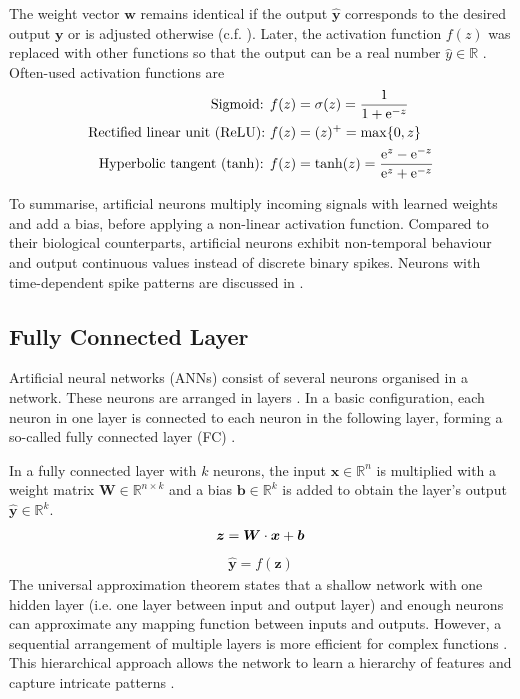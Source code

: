 %
The weight vector $\boldsymbol{w}$ remains identical if the output $\boldsymbol{\hat{y}}$ corresponds to the desired output $\boldsymbol{y}$ or is adjusted otherwise (c.f. ). Later, the activation function \(f(z)\) was replaced with other functions so that the output can be a real number \(\hat{y} \in \mathbb{R}\) . Often-used activation functions are
%
\begin{align}\eqlbl{act_functions}%
		\text{Sigmoid: } & f(z) = \sigma(z) = \frac{1}{1+\mathrm{e}^{-z}}\\
		\text{Rectified linear unit (ReLU): } & f(z) = (z)^{+} = \max\{0, z\}\\
		\text{Hyperbolic tangent (tanh): }  & f(z) = \tanh(z) = \frac{\mathrm{e}^{z}-\mathrm{e}^{-z}}{\mathrm{e}^{z}+\mathrm{e}^{-z}}
\end{align}


To summarise, artificial neurons multiply incoming signals with learned weights and add a bias, before applying a non-linear activation function.
Compared to their biological counterparts, artificial neurons exhibit non-temporal behaviour and output continuous values instead of discrete binary spikes. Neurons with time-dependent spike patterns are discussed in .

\subsection{Fully Connected Layer}
Artificial neural networks (ANNs) consist of several neurons organised in a network. These neurons are arranged in layers \cite{prince_understanding_2023}. In a basic configuration, each neuron in one layer is connected to each neuron in the following layer, forming a so-called fully connected layer (FC) .

In a fully connected layer with $k$ neurons, the input $\boldsymbol{x} \in \mathbb{R}^n$ is multiplied with a weight matrix $\boldsymbol{W} \in \mathbb{R}^{n\times k}$ and a bias $\boldsymbol{b} \in \mathbb{R}^k$ is added to obtain the layer's output $\boldsymbol{\hat{y}} \in \mathbb{R}^k$.
\begin{align}\eqlbl{nn3}%
	\boldsymbol{z} = \boldsymbol{W} \cdot \boldsymbol{x} + \boldsymbol{b}
\end{align}
\begin{align}
	\hat{\boldsymbol{y}} = f(\boldsymbol{z})
\end{align}
%
The universal approximation theorem  states that a shallow network with one hidden layer (i.e. one layer between input and output layer) and enough neurons can approximate any mapping function between inputs and outputs.
However, a sequential arrangement of multiple layers is more efficient for complex functions . This hierarchical approach allows the network to learn a hierarchy of features and capture intricate patterns .

